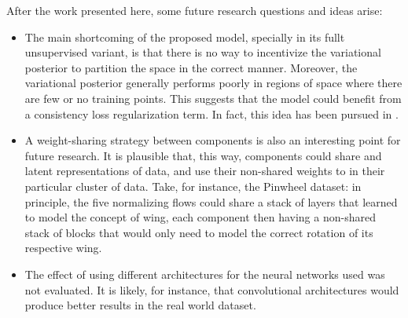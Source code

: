 After the work presented here, some future research questions and ideas
arise:
\begin{itemize}
    \item The main shortcoming of the proposed model, specially in its fullt
    unsupervised variant, is that there is no way to incentivize the variational
    posterior to partition the space in the correct manner. Moreover, the  variational
    posterior generally performs poorly in regions of space where there are few
    or no training points. This suggests that the model could benefit from a consistency
    loss regularization term. In fact, this idea has been pursued in \autocite{semisuplearning_nflows}.
    \item A weight-sharing strategy between components is also an interesting
    point for future research. It is plausible that, this way, components could
    share  and latent representations of data, and use their non-shared
    weights to  in their particular cluster of data. Take,
    for instance, the Pinwheel dataset: in principle, the five normalizing flows
    could share a stack of layers that learned to model the concept of wing,
    each component then having a non-shared stack of blocks that would only
    need to model the correct rotation of its respective wing.
    \item The effect of using different architectures for the neural networks used
    was not evaluated. It is likely, for instance, that convolutional architectures
    would produce better results in the real world dataset.
\end{itemize}

